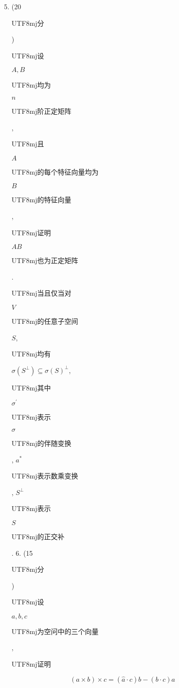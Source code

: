 \documentclass[10pt]{article}
\begin{document}
\begin{enumerate}
  \setcounter{enumi}{4}
  \item (20 \begin{CJK}{UTF8}{mj}分\end{CJK}) \begin{CJK}{UTF8}{mj}设\end{CJK} $A, B$ \begin{CJK}{UTF8}{mj}均为\end{CJK} $n$ \begin{CJK}{UTF8}{mj}阶正定矩阵\end{CJK}, \begin{CJK}{UTF8}{mj}且\end{CJK} $A$ \begin{CJK}{UTF8}{mj}的每个特征向量均为\end{CJK} $B$ \begin{CJK}{UTF8}{mj}的特征向量\end{CJK}, \begin{CJK}{UTF8}{mj}证明\end{CJK} $A B$ \begin{CJK}{UTF8}{mj}也为正定矩阵\end{CJK}. \begin{CJK}{UTF8}{mj}当且仅当对\end{CJK} $V$ \begin{CJK}{UTF8}{mj}的任意子空间\end{CJK} $S$, \begin{CJK}{UTF8}{mj}均有\end{CJK} $\sigma\left(S^{\perp}\right) \subseteq \sigma(S)^{\perp}$, \begin{CJK}{UTF8}{mj}其中\end{CJK} $\sigma^{\prime}$ \begin{CJK}{UTF8}{mj}表示\end{CJK} $\sigma$ \begin{CJK}{UTF8}{mj}的伴随变换\end{CJK}, $a^{*}$ \begin{CJK}{UTF8}{mj}表示数乘变换\end{CJK}, $S^{\perp}$ \begin{CJK}{UTF8}{mj}表示\end{CJK} $S$ \begin{CJK}{UTF8}{mj}的正交补\end{CJK}. 6. (15 \begin{CJK}{UTF8}{mj}分\end{CJK}) \begin{CJK}{UTF8}{mj}设\end{CJK} $a, b, c$ \begin{CJK}{UTF8}{mj}为空问中的三个向量\end{CJK}, \begin{CJK}{UTF8}{mj}证明\end{CJK}
\end{enumerate}
$$
(a \times b) \times c=(\hat{a} \cdot c) b-(b \cdot c) a
$$
\end{document}
